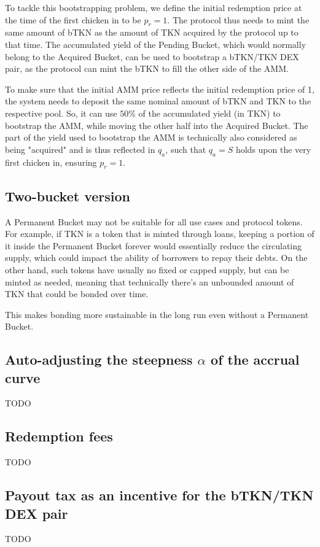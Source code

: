 \documentclass{article}
\begin{document}
To tackle this bootstrapping problem, we define the initial redemption price at the time of the first chicken in to be $p_r = 1$. The protocol thus needs to mint the same amount of bTKN as the amount of TKN acquired by the protocol up to that time. The accumulated yield of the Pending Bucket, which would normally belong to the Acquired Bucket, can be used to bootstrap a bTKN/TKN DEX pair, as the protocol can mint the bTKN to fill the other side of the AMM.

To make sure that the initial AMM price reflects the initial redemption price of 1, the system needs to deposit the same nominal amount of bTKN and TKN to the respective pool. So, it can use $50\%$ of the accumulated yield (in TKN) to bootstrap the AMM, while moving the other half into the Acquired Bucket. The part of the yield used to bootstrap the AMM is technically also considered as being "acquired" and is thus reflected in $q_a$, such that $q_a = S$ holds upon the very first chicken in, ensuring $p_r = 1$.

\subsection{Two-bucket version}
\label{sec:two-bucket}
A Permanent Bucket may not be suitable for all use cases and protocol tokens. For example, if TKN is a token that is minted through loans, keeping a portion of it inside the Permanent Bucket forever would essentially reduce the circulating supply, which could impact the ability of borrowers to repay their debts. On the other hand, such tokens have usually no fixed or capped supply, but can be minted as needed, meaning that technically there's an unbounded amount of TKN that could be bonded over time.

This makes bonding more sustainable in the long run even without a Permanent Bucket.


\subsection{Auto-adjusting the steepness $\alpha$ of the accrual curve}
  \label{sec:adjustment}
TODO

\subsection{Redemption fees}
  \label{sec:redemption-fee}
TODO

\subsection{Payout tax as an incentive for the bTKN/TKN DEX pair}
  \label{sec:payout-tax}
TODO
\end{document}
